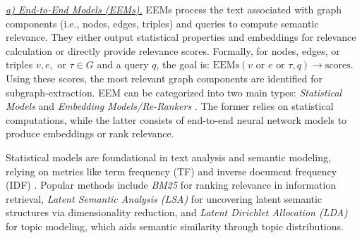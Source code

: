 {{\it \underline{a) End-to-End Models (EEMs).}} 
EEMs process the text associated with graph components 
(i.e., nodes, edges, triples) and queries to compute semantic relevance.
They either output statistical properties and embeddings for relevance calculation or directly provide relevance scores.
Formally, for nodes, edges, or triples \( v, e, \text{~or~} \tau \in G \) and a query \( q \), the goal is: $\text{EEMs} (v \text{ or } e \text{ or } \tau, q) \to \text{scores}.$ 
Using these scores, the most relevant graph components are identified for subgraph-extraction.
EEM can be categorized into two main types: {\it Statistical Models} {\cite{TFIDF,BM25,BM25+}} and {\it Embedding Models/Re-Rankers} {\cite{reimers-2019-sentence-bert,BGE}}. The former relies on statistical computations, while the latter consists of end-to-end neural network models to produce embeddings or rank relevance. 



   {\it {}}
Statistical models are foundational in text analysis and semantic modeling, relying on metrics 
like term frequency (TF) and inverse document frequency (IDF)  {\cite{TFIDF}}. 
Popular methods include {\it BM25}  {\cite{BM25}} for ranking relevance in information retrieval, {\it Latent Semantic Analysis (LSA)}  {\cite{LSA}}  for uncovering latent semantic structures via dimensionality reduction, and {\it Latent Dirichlet Allocation (LDA)}  {\cite{LDA}}  for topic modeling, which aids 
semantic similarity through topic distributions.


}
